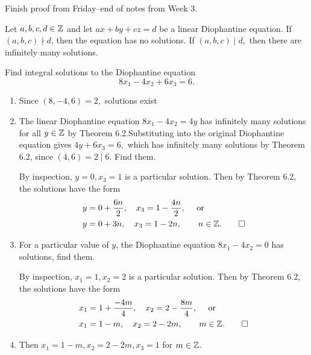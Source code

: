 \documentclass[letterpaper, 11 pt]{ximera}
\begin{document}
Finish proof from Friday--end of notes from Week 3.


\begin{prop}\label{prop_3diophantine}
    Let $a,b,c,d\in\mathbb Z$ and let $ax+by+cz=d$ be a linear Diophantine equation. If $(a,b,c)\nmid d$, then the equation has no solutions. If $(a,b,c)\mid d,$ then there are infinitely many solutions.
\end{prop}

\begin{br}
Find integral solutions to the Diophantine equation \[8x_1-4x_2+6x_3=6.\]

\begin{enumerate}
    \item Since $(8,-4,6)=2,$ solutions exist
    \item The linear Diophantine equation $8x_1-4x_2=4y$ has infinitely many solutions for all $y\in\mathbb Z$ by Theorem 6.2.Substituting into the original Diophantine equation gives $4y+6x_3=6,$ which has infinitely many solutions by Theorem 6.2, since $(4,6)=2\mid 6$. Find them.
     
    \begin{solution}
        By inspection, $y=0,x_3=1$ is a particular solution. Then by Theorem 6.2, the solutions have the form 
        \begin{align*}
            y&=0+\frac{6n}{2},\quad x_3=1-\frac{4n}{2}, \quad \textnormal{ or }\\
            y&=0+3n,\quad x_3=1-2n, \qquad n\in\mathbb Z. \qedhere
        \end{align*}
        \end{solution}
    \item  For a particular value of $y$, the Diophantine equation $8x_1-4x_2=0$ has solutions, find them. 
    \begin{solution}
        By inspection, $x_1=1,x_2=2$ is a particular solution. Then by Theorem 6.2, the solutions have the form 
        \begin{align*}
            x_1&=1+\frac{-4m}{4},\quad x_2=2-\frac{8m}{4}, \quad \textnormal{ or }\\
            x_1&=1-m,\quad x_2=2-2m, \qquad m\in\mathbb Z. \qedhere
        \end{align*}
        \end{solution}
    \item Then $x_1=1-m, x_2=2-2m,x_3=1$ for $m\in\mathbb Z$.
\end{enumerate}
\end{br}
\end{document}

